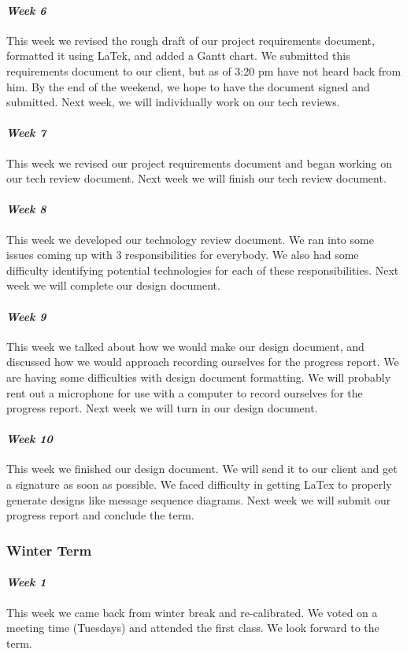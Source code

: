 \documentclass[onecolumn, draftclsnofoot,10pt, compsoc]{IEEEtran}
\begin{document}
\paragraph{\emph{Week 6}}
This week we revised the rough draft of our project requirements document, formatted it using LaTek, and added a Gantt chart. We submitted this requirements document to our client, but as of 3:20 pm have not heard back from him. By the end of the weekend, we hope to have the document signed and submitted. Next week, we will individually work on our tech reviews.
\paragraph{\emph{Week 7}}
This week we revised our project requirements document and began working on our tech review document. Next week we will finish our tech review document.
\paragraph{\emph{Week 8}}
This week we developed our technology review document. We ran into some issues coming up with 3 responsibilities for everybody. We also had some difficulty identifying potential technologies for each of these responsibilities. Next week we will complete our design document.
\paragraph{\emph{Week 9}}
This week we talked about how we would make our design document, and discussed how we would approach recording ourselves for the progress report. We are having some difficulties with design document formatting. We will probably rent out a microphone for use with a computer to record ourselves for the progress report. Next week we will turn in our design document.
\paragraph{\emph{Week 10}}
This week we finished our design document. We will send it to our client and get a signature as soon as possible. We faced difficulty in getting LaTex to properly generate designs like message sequence diagrams. Next week we will submit our progress report and conclude the term.
\subsubsection{Winter Term}
\paragraph{\emph{Week 1}}
This week we came back from winter break and re-calibrated. We voted on a meeting time (Tuesdays) and attended the first class. We look forward to the term.
\end{document}
